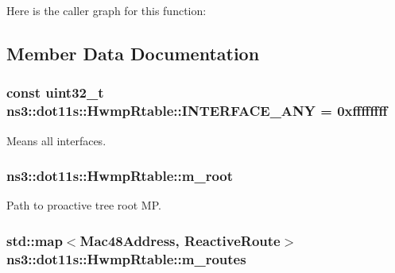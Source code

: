 Here is the caller graph for this function\+:




\subsection{Member Data Documentation}
\subsubsection[{\texorpdfstring{I\+N\+T\+E\+R\+F\+A\+C\+E\+\_\+\+A\+NY}{INTERFACE_ANY}}]{\setlength{\rightskip}{0pt plus 5cm}const uint32\+\_\+t ns3\+::dot11s\+::\+Hwmp\+Rtable\+::\+I\+N\+T\+E\+R\+F\+A\+C\+E\+\_\+\+A\+NY = 0xffffffff\hspace{0.3cm}{\ttfamily [static]}}\hypertarget{classns3_1_1dot11s_1_1HwmpRtable_a2fa1f4fa97e71399696c2e9a8a95b838}{}\label{classns3_1_1dot11s_1_1HwmpRtable_a2fa1f4fa97e71399696c2e9a8a95b838}


Means all interfaces. 

\subsubsection[{\texorpdfstring{m\+\_\+root}{m_root}}]{ ns3\+::dot11s\+::\+Hwmp\+Rtable\+::m\+\_\+root\hspace{0.3cm}{\ttfamily [private]}}\hypertarget{classns3_1_1dot11s_1_1HwmpRtable_ac0dfb00c0c51b00ea3d5d78d0fbc5cd7}{}\label{classns3_1_1dot11s_1_1HwmpRtable_ac0dfb00c0c51b00ea3d5d78d0fbc5cd7}


Path to proactive tree root MP. 

\subsubsection[{\texorpdfstring{m\+\_\+routes}{m_routes}}]{\setlength{\rightskip}{0pt plus 5cm}std\+::map$<${\bf Mac48\+Address}, {\bf Reactive\+Route}$>$ ns3\+::dot11s\+::\+Hwmp\+Rtable\+::m\+\_\+routes\hspace{0.3cm}{\ttfamily [private]}}\hypertarget{classns3_1_1dot11s_1_1HwmpRtable_a72afac5a0c979b3d4f160786ef865eab}{}\label{classns3_1_1dot11s_1_1HwmpRtable_a72afac5a0c979b3d4f160786ef865eab}


